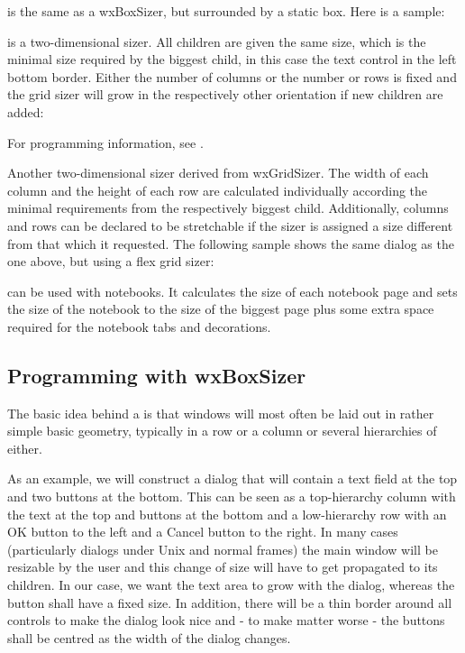

 is the same as a wxBoxSizer, but surrounded by a
static box. Here is a sample:



 is a two-dimensional sizer. All children are given the
same size, which is the minimal size required by the biggest child, in
this case the text control in the left bottom border. Either the number
of columns or the number or rows is fixed and the grid sizer will grow
in the respectively other orientation if new children are added:


For programming information, see .


Another two-dimensional sizer derived from
wxGridSizer. The width of each column and the height of each row
are calculated individually according the minimal requirements
from the respectively biggest child. Additionally, columns and
rows can be declared to be stretchable if the sizer is assigned
a size different from that which it requested. The following sample shows
the same dialog as the one above, but using a flex grid sizer:



 can be used
with notebooks. It calculates the size of each
notebook page and sets the size of the notebook to the size
of the biggest page plus some extra space required for the
notebook tabs and decorations.

\subsection{Programming with wxBoxSizer}\label{boxsizerprogramming}

The basic idea behind a  is that windows will most often be laid out in rather
simple basic geometry, typically in a row or a column or several hierarchies of either.

As an example, we will construct a dialog that will contain a text field at the top and
two buttons at the bottom. This can be seen as a top-hierarchy column with the text at
the top and buttons at the bottom and a low-hierarchy row with an OK button to the left
and a Cancel button to the right. In many cases (particularly dialogs under Unix and
normal frames) the main window will be resizable by the user and this change of size
will have to get propagated to its children. In our case, we want the text area to grow
with the dialog, whereas the button shall have a fixed size. In addition, there will be
a thin border around all controls to make the dialog look nice and - to make matter worse -
the buttons shall be centred as the width of the dialog changes.

